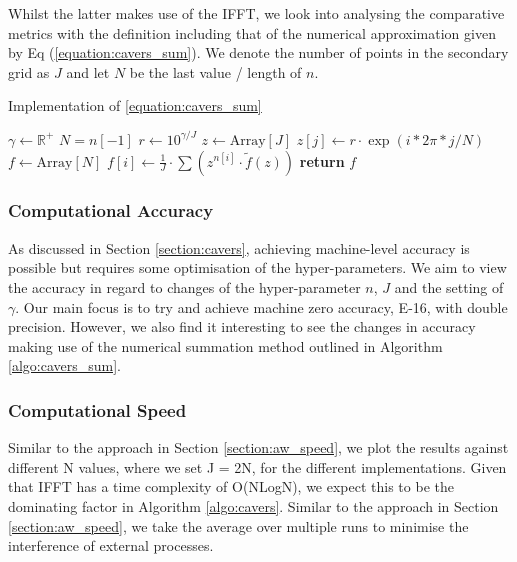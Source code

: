 \documentclass[a4paper]{report}
\begin{document}
Whilst the latter makes use of the IFFT, we look into analysing the comparative metrics with the definition including that of the numerical approximation given by Eq (\ref{equation:cavers_sum}). We denote the number of points in the secondary grid as $J$ and let $N$ be the last value / length of $n$.

\begin{algorithm}[H]
\caption{Implementation of \autoref{equation:cavers_sum}}
\label{algo:cavers_sum}
\begin{algorithmic}[1]
	\State $\gamma \gets \mathbb{R}^+$
	\State $N = n[-1]$
    \State $r \gets 10^{\gamma / J}$ 
    \State $z \gets \text{Array}[J]$
                \State $z[j] \gets r \cdot \exp{(i * 2\pi * j / N)}$
            \EndFor
    \State $f \gets \text{Array}[N]$
        \State $f[i] \gets \frac{1}{J} \cdot \sum (z^{n[i]} \cdot \tilde{f}(z))$ 
    \EndFor
    \State \textbf{return} $f$
\EndProcedure
\end{algorithmic}
\end{algorithm}

\subsubsection{Computational Accuracy}
As discussed in Section \ref{section:cavers}, achieving machine-level accuracy is possible but requires some optimisation of the hyper-parameters. We aim to view the accuracy in regard to changes of the hyper-parameter $n$, $J$ and the setting of $\gamma$. Our main focus is to try and achieve machine zero accuracy, E-16, with double precision. However, we also find it interesting to see the changes in accuracy making use of the numerical summation method outlined in Algorithm \ref{algo:cavers_sum}.

\subsubsection{Computational Speed}
Similar to the approach in Section \ref{section:aw_speed}, we plot the results against different N values, where we set J = 2N, for the different implementations. Given that IFFT has a time complexity of O(NLogN), we expect this to be the dominating factor in Algorithm \ref{algo:cavers}. Similar to the approach in Section \ref{section:aw_speed}, we take the average over multiple runs to minimise the interference of external processes.
\end{document}
